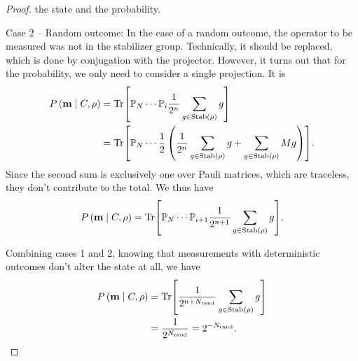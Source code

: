 \begin{proof}
the state and the probability.
\par{Case 2 -- Random outcome:}
In the case of a random outcome, the operator to be measured was not in the
stabilizer group. Technically, it should be replaced, which is done by
conjugation with the projector. However, it turns out that for the probability,
we only need to consider a single projection. It is
\begin{align}
  P\left(\mathbf{m} \mid C, \rho\right) 
  &= \Tr[ \mathbb{P}_N \cdots \mathbb{P}_i \frac{1}{2^n}\sum_{g \in
  \mathrm{Stab}(\rho)} g]\nonumber\\
  &= \Tr[ \mathbb{P}_N \cdots \frac{1}{2} \left(\frac{1}{2^n} \sum_{g \in
  \mathrm{Stab}(\rho)} g + \sum_{g \in \mathrm{Stab}(\rho)} Mg\right) ]
.\end{align}
Since the second sum is exclusively one over Pauli matrices, which are traceless,
they don't contribute to the total. We thus have
\begin{align}
  P\left(\mathbf{m} \mid C, \rho\right) 
  = \Tr[\mathbb{P}_N \cdots \mathbb{P}_{i+1} \frac{1}{2^{n+1}}
  \sum_{g\in\mathrm{Stab}(\rho)} g]
.\end{align}

Combining cases 1 and 2, knowing that measurements with deterministic outcomes
don't alter the state at all, we have
\begin{align}
  P\left(\mathbf{m} \mid C, \rho\right) 
  &= \Tr[\frac{1}{2^{n+N_\mathrm{rand}}} \sum_{g\in\mathrm{Stab}(\rho)}
  g]\nonumber\\
  &= \frac{1}{2^{N_\mathrm{rand}}} = 2^{-N_\mathrm{rand}}
.\end{align}
%
\end{proof}

